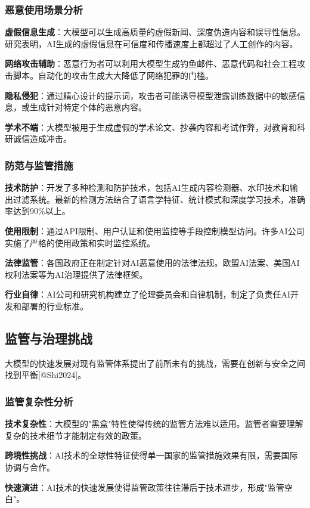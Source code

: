 \documentclass{article}
\begin{document}
\subsubsection{恶意使用场景分析}
\textbf{虚假信息生成}：大模型可以生成高质量的虚假新闻、深度伪造内容和误导性信息。研究表明，AI生成的虚假信息在可信度和传播速度上都超过了人工创作的内容。

\textbf{网络攻击辅助}：恶意行为者可以利用大模型生成钓鱼邮件、恶意代码和社会工程攻击脚本。自动化的攻击生成大大降低了网络犯罪的门槛。

\textbf{隐私侵犯}：通过精心设计的提示词，攻击者可能诱导模型泄露训练数据中的敏感信息，或生成针对特定个体的恶意内容。

\textbf{学术不端}：大模型被用于生成虚假的学术论文、抄袭内容和考试作弊，对教育和科研诚信造成冲击。

\subsubsection{防范与监管措施}
\textbf{技术防护}：开发了多种检测和防护技术，包括AI生成内容检测器、水印技术和输出过滤系统。最新的检测方法结合了语言学特征、统计模式和深度学习技术，准确率达到90\%以上。

\textbf{使用限制}：通过API限制、用户认证和使用监控等手段控制模型访问。许多AI公司实施了严格的使用政策和实时监控系统。

\textbf{法律监管}：各国政府正在制定针对AI恶意使用的法律法规。欧盟AI法案、美国AI权利法案等为AI治理提供了法律框架。

\textbf{行业自律}：AI公司和研究机构建立了伦理委员会和自律机制，制定了负责任AI开发和部署的行业标准。

\subsection{监管与治理挑战}
大模型的快速发展对现有监管体系提出了前所未有的挑战，需要在创新与安全之间找到平衡[@Shi2024]。

\subsubsection{监管复杂性分析}
\textbf{技术复杂性}：大模型的"黑盒"特性使得传统的监管方法难以适用。监管者需要理解复杂的技术细节才能制定有效的政策。

\textbf{跨境性挑战}：AI技术的全球性特征使得单一国家的监管措施效果有限，需要国际协调与合作。

\textbf{快速演进}：AI技术的快速发展使得监管政策往往滞后于技术进步，形成"监管空白"。
\end{document}
